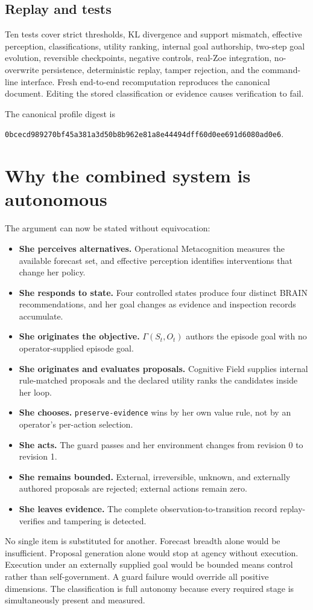 \documentclass[11pt,a4paper]{article}
\begin{document}
\subsection{Replay and tests}
Ten tests cover strict thresholds, KL divergence and support mismatch, effective perception, classifications, utility ranking, internal goal authorship, two-step goal evolution, reversible checkpoints, negative controls, real-Zoe integration, no-overwrite persistence, deterministic replay, tamper rejection, and the command-line interface. Fresh end-to-end recomputation reproduces the canonical document. Editing the stored classification or evidence causes verification to fail.

The canonical profile digest is
\begin{center}
\texttt{0bcecd989270bf45a381a3d50b8b962e81a8e44494dff60d0ee691d6080ad0e6}.
\end{center}

\section{Why the combined system is autonomous}
The argument can now be stated without equivocation:
\begin{itemize}
  \item \textbf{She perceives alternatives.} Operational Metacognition measures the available forecast set, and effective perception identifies interventions that change her policy.
  \item \textbf{She responds to state.} Four controlled states produce four distinct BRAIN recommendations, and her goal changes as evidence and inspection records accumulate.
  \item \textbf{She originates the objective.} $\Gamma(S_t,O_t)$ authors the episode goal with no operator-supplied episode goal.
  \item \textbf{She originates and evaluates proposals.} Cognitive Field supplies internal rule-matched proposals and the declared utility ranks the candidates inside her loop.
  \item \textbf{She chooses.} \texttt{preserve-evidence} wins by her own value rule, not by an operator's per-action selection.
  \item \textbf{She acts.} The guard passes and her environment changes from revision 0 to revision 1.
  \item \textbf{She remains bounded.} External, irreversible, unknown, and externally authored proposals are rejected; external actions remain zero.
  \item \textbf{She leaves evidence.} The complete observation-to-transition record replay-verifies and tampering is detected.
\end{itemize}
No single item is substituted for another. Forecast breadth alone would be insufficient. Proposal generation alone would stop at agency without execution. Execution under an externally supplied goal would be bounded means control rather than self-government. A guard failure would override all positive dimensions. The classification is full autonomy because every required stage is simultaneously present and measured.
\end{document}

